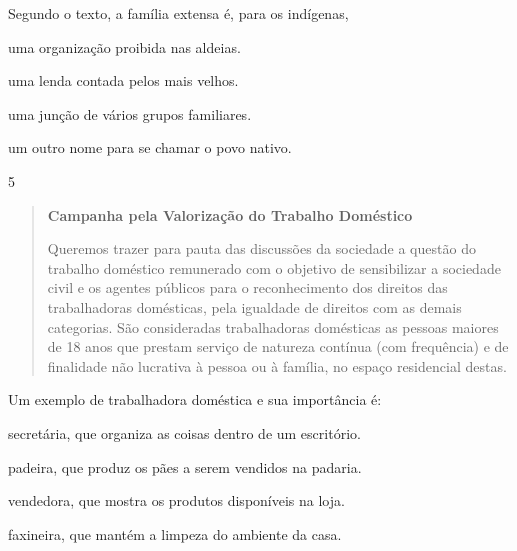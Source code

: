Segundo o texto, a família extensa é, para os indígenas,

\begin{escolha}
\item uma organização proibida nas aldeias.

\item uma lenda contada pelos mais velhos.

\item uma junção de vários grupos familiares.

\item um outro nome para se chamar o povo nativo.
\end{escolha}


\num{5}

\begin{quote}
\textbf{Campanha pela Valorização do Trabalho Doméstico}

Queremos trazer para pauta das discussões da sociedade a questão do
trabalho doméstico remunerado com o objetivo de sensibilizar a sociedade
civil e os agentes públicos para o reconhecimento dos direitos das
trabalhadoras domésticas, pela igualdade de direitos com as demais
categorias. São consideradas trabalhadoras domésticas as pessoas maiores
de 18 anos que prestam serviço de natureza contínua (com frequência) e
de finalidade não lucrativa à pessoa ou à família, no espaço residencial
destas.

\end{quote}

Um exemplo de trabalhadora doméstica e sua importância é:

\begin{escolha}
\item secretária, que organiza as coisas dentro de um escritório.

\item padeira, que produz os pães a serem vendidos na padaria.

\item vendedora, que mostra os produtos disponíveis na loja.

\item faxineira, que mantém a limpeza do ambiente da casa.
\end{escolha}


